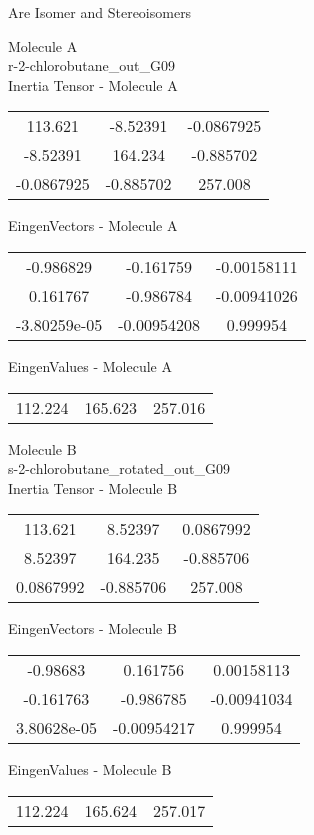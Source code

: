 \begin{center}
\vtab
\vtab
\textcolor{NavyBlue}{\Large Are Isomer and Stereoisomers}
\end{center}
\newpage
\begin{multicols}{2}
\begin{center}
Molecule A \\ 
r-2-chlorobutane\_out\_G09
\\
Inertia Tensor - Molecule A \\
\vtab
\begin{tabular}{|c c c|}
113.621	 & 	-8.52391	 & 	-0.0867925	 \\
-8.52391	 & 	164.234	 & 	-0.885702	 \\
-0.0867925	 & 	-0.885702	 & 	257.008
\end{tabular}

\vtab
 EingenVectors - Molecule A     \\
\vtab
\begin{tabular}{|c c c|}
-0.986829	 & 	-0.161759	 & 	-0.00158111	 \\
0.161767	 & 	-0.986784	 & 	-0.00941026	 \\
-3.80259e-05	 & 	-0.00954208	 & 	0.999954
\end{tabular}

\vtab
 EingenValues - Molecule A     \\
\vtab
\begin{tabular}{|c c c|}
112.224	 & 	165.623	 & 	257.016
\end{tabular}
\columnbreak

Molecule B \\ 
s-2-chlorobutane\_rotated\_out\_G09
\\
Inertia Tensor - Molecule B \\
\vtab
\begin{tabular}{|c c c|}
113.621	 & 	8.52397	 & 	0.0867992	 \\
8.52397	 & 	164.235	 & 	-0.885706	 \\
0.0867992	 & 	-0.885706	 & 	257.008
\end{tabular}

\vtab
 EingenVectors - Molecule B     \\
\vtab
\begin{tabular}{|c c c|}
-0.98683	 & 	0.161756	 & 	0.00158113	 \\
-0.161763	 & 	-0.986785	 & 	-0.00941034	 \\
3.80628e-05	 & 	-0.00954217	 & 	0.999954
\end{tabular}

\vtab
 EingenValues - Molecule B     \\
\vtab
\begin{tabular}{|c c c|}
112.224	 & 	165.624	 & 	257.017
\end{tabular}

\end{center}
\end{multicols}

